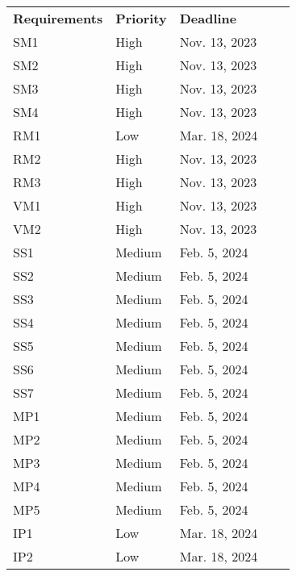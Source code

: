 \documentclass[12pt]{article}
\begin{document}
\begin{table}[H]
\centering
\begin{tabular}{|l|l|l|ll}
\cline{1-3}
\textbf{Requirements} & \textbf{Priority} & \textbf{Deadline} &  &  \\ \cline{1-3}
SM1         & High   & Nov. 13, 2023      &  &  \\ \cline{1-3}
SM2         & High   & Nov. 13, 2023      &  &  \\ \cline{1-3}
SM3         & High   & Nov. 13, 2023      &  &  \\ \cline{1-3}
SM4         & High   & Nov. 13, 2023      &  &  \\ \cline{1-3}
RM1         & Low   & Mar. 18, 2024      &  &  \\ \cline{1-3}
RM2        & High   & Nov. 13, 2023      &  &  \\ \cline{1-3}
RM3         & High   & Nov. 13, 2023      &  &  \\ \cline{1-3}
VM1         & High   & Nov. 13, 2023      &  &  \\ \cline{1-3}
VM2         & High   & Nov. 13, 2023      &  &  \\ \cline{1-3}
SS1         & Medium   & Feb. 5, 2024      &  &  \\ \cline{1-3}
SS2         & Medium   & Feb. 5, 2024      &  &  \\ \cline{1-3}
SS3         & Medium   & Feb. 5, 2024      &  &  \\ \cline{1-3}
SS4         & Medium   & Feb. 5, 2024      &  &  \\ \cline{1-3}
SS5         & Medium   & Feb. 5, 2024      &  &  \\ \cline{1-3}
SS6         & Medium   & Feb. 5, 2024      &  &  \\ \cline{1-3}
SS7         & Medium   & Feb. 5, 2024      &  &  \\ \cline{1-3}
MP1         & Medium   & Feb. 5, 2024      &  &  \\ \cline{1-3}
MP2         & Medium   & Feb. 5, 2024      &  &  \\ \cline{1-3}
MP3         & Medium   & Feb. 5, 2024      &  &  \\ \cline{1-3}
MP4         & Medium   & Feb. 5, 2024      &  &  \\ \cline{1-3}
MP5         & Medium   & Feb. 5, 2024      &  &  \\ \cline{1-3}
IP1         & Low   & Mar. 18, 2024      &  &  \\ \cline{1-3}
IP2         & Low   & Mar. 18, 2024      &  &  \\ \cline{1-3}

\end{tabular}
\end{table}
\end{document}
